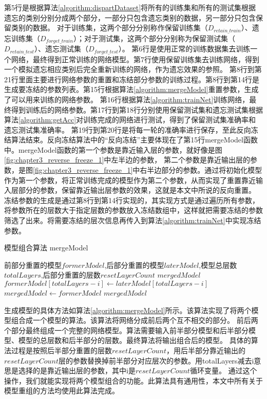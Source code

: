 第5行是根据算法\ref{algorithm:dispartDataset}将所有的训练集和所有的测试集根据遗忘的类别分别分成两个部分，一部分只包含遗忘类别的数据，另一部分只包含保留类别的数据。
对于训练集，这两个部分分别称作保留训练集（$D_{retain\_train}$）、遗忘训练集（$D_{forget\_train}$）；对于测试集，这两个部分分别称为保留测试集（$D_{retain\_test}$）、遗忘测试集（$D_{forget\_test}$）。
第6行是使用正常的训练数据集去训练一个网络，最终得到正常训练的网络模型。第7行使用保留训练集去训练网络，得到一个模拟遗忘相应类别后完全重新训练的网络，作为遗忘效果的参照。
第8行到第21行里面主要进行网络参数的重置和冻结部分参数的训练过程。第8行到第14行是生成要冻结的参数列表。第15行根据算法\ref{algorithm:mergeModel}重置参数，生成了可以用来训练的网络参数。
第16行根据算法\ref{algorithm:trainNet}训练网络，最终得到训练后的网络参数。第17行到第18行分别使用保留测试集和遗忘测试集根据算法\ref{algorithm:getAcc}对训练完成的网络进行测试，得到了保留测试集准确率和遗忘测试集准确率。
第19行到第20行是将每一轮的准确率进行保存，至此反向冻结算法结束。反向冻结算法中的“反向冻结”主要体现在了第15行mergeModel函数中。mergeModel函数的第一个参数是靠近输入层的参数，就好像是图\ref{fig:chapter3_reverse_freeze_1}中左半边的参数，
第二个参数是靠近输出层的参数，是图\ref{fig:chapter3_reverse_freeze_1}中右半边部分的参数。通过将初始化模型作为第一个参数，将正常训练完成的模型作为第二个参数，从而实现了重置靠近输入层部分的参数，保留靠近输出层参数的效果，这就是本文中所说的反向重置。
冻结参数的生成是通过第8行到第14行实现的，其实现方式是通过遍历所有参数，将参数所在的层数大于指定层数的参数放入冻结数组中，这样就把需要冻结的参数筛选了出来。将需要冻结的层次信息再传入到算法\ref{algorithm:trainNet}中实现冻结参数。

\begin{algorithm}
	\renewcommand{\algorithmicrequire}{\textbf{Input:}}
	\renewcommand{\algorithmicensure}{\textbf{Output:}}
	\caption{模型组合算法 mergeModel}
	\label{algorithm:mergeModel}
	\begin{algorithmic}[1]
        \REQUIRE 前部分重置的模型$formerModel$,后部分重置的模型$laterModel$,模型总层数$totalLayers$,后部分重置的层数$resetLayerCount$
        \ENSURE  $mergedModel$
            \STATE $formerModel[totalLayers - i] \gets laterModel[totalLayers - i]$
        \ENDFOR
        \STATE $mergedModel \gets formerModel$
        \RETURN $mergedModel$
	\end{algorithmic}  
\end{algorithm}
生成模型的具体方法如算法\ref{algorithm:mergeModel}所示。该算法实现了将两个模型组合成一个模型的算法。该算法将网络分成前后两个互不相交的部分。
前后两个部分最终组成一个完整的网络模型。算法需要输入前半部分模型和后半部分模型、模型的总层数和后半部分的层数。最终算法将输出组合后的模型。
具体的算法过程是按照后半部分重置的层数$resetLayerCount$，用后半部分靠近输出的$resetLayerCount$层的参数替换掉前半部分对应层次的参数。用totalLayers减去i意思是选择的是靠近输出层的参数，其中i是$resetLayerCount$循环变量。
通过这个操作，我们就能实现将两个模型组合的功能。此算法具有通用性，本文中所有关于模型重组的方法均使用此算法完成。

